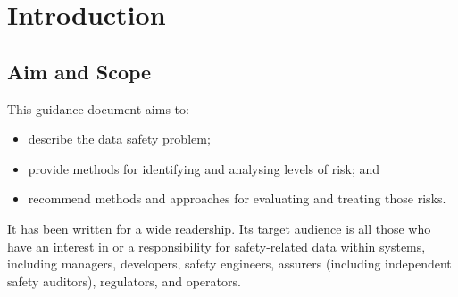 %
%

%
%
\setcounter{page}{1}
\pagestyle{Standard} %
\thispagestyle{FirstPage}

\chapter{Introduction} \label{bkm:introduction}

\section{Aim and Scope}
This guidance document aims to:
\begin{itemize}
	\item describe the data safety problem;
	\item provide methods for identifying and analysing levels of risk; and
	\item recommend methods and approaches for evaluating and treating those risks.
\end{itemize}

It has been written for a wide readership. Its target audience is all those who have an interest in or a responsibility for safety-related data within systems, including managers, developers, safety engineers, assurers (including independent safety auditors), regulators, and operators. 

